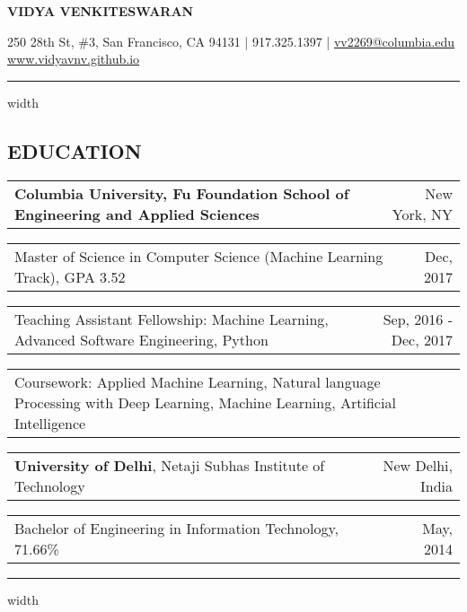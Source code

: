 \documentclass[10.5pt]{article}
\makeatletter
\newenvironment{subs}
  {\adjustwidth{1em}{0pt}}
  {\endadjustwidth}
\newcommand{\headerrow}[2]
{\begin{tabular*}{\linewidth}{l@{\extracolsep{\fill}}r}
	#1 &
	#2 \\
\end{tabular*}}
\makeatother
\begin{document}
\begin{center}
{\LARGE \textbf{VIDYA VENKITESWARAN}}

250 28th St, \#3, San Francisco, CA 94131 | 917.325.1397
| \href{mailto:vidya.venkiteswaran@columbia.edu}{vv2269@columbia.edu}  \\\href{http://vidyavnv.github.io/}{www.vidyavnv.github.io}
\end{center}
\vspace{-2pt}
\normalsize
\hrule width \hsize \kern 0.5mm
\vspace{-10pt}
\subsection*{\textbf{EDUCATION}}
\begin{subs}
\vspace{-3pt}
\headerrow
		{\textbf{Columbia University, Fu Foundation School of Engineering and Applied Sciences}}
                {New York, NY}
\vspace{1pt}
\headerrow
               {Master of Science in Computer Science (Machine Learning Track), GPA 3.52}
               {Dec, 2017}
\vspace{1pt}
\headerrow
	      {Teaching Assistant Fellowship: Machine Learning, Advanced Software Engineering, Python}
	      {Sep, 2016 - Dec, 2017}
\vspace{5pt}	      
\headerrow
	      {Coursework: Applied Machine Learning, Natural language Processing with Deep Learning, Machine Learning, Artificial Intelligence}
	      {}	
\vspace{-1pt}	      	      
\headerrow
		{\textbf{University of Delhi}, Netaji Subhas Institute of Technology}
                {New Delhi, India}
\vspace{1pt}	      	      
\headerrow
               {Bachelor of Engineering in Information Technology, 71.66\%}
               {May, 2014}
	{}
\end{subs}

\vspace{0.6em}
\normalsize
\hrule width \hsize \kern 0.5mm
\vspace{-10pt}
\end{document}
